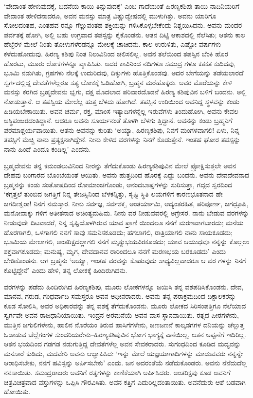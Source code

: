 ‘ವೇದಾಂತ ಹೇಳುವುದಕ್ಕೆ, ಬದನೆಯ ಕಾಯಿ ತಿನ್ನುವುದಕ್ಕೆ’ ಎಂಬ ಗಾದೆಯಂತೆ ಹಿರಣ್ಯಕಶಿಪು ತಾಯಿ ನಾದಿನಿಯರಿಗೆ ವೇದಾಂತ ಹೇಳಿದನಾದರೂ, ಅವನ ಮನಸ್ಸು ಮಾತ್ರ ವಿಷ್ಣುದ್ವೇಷದಲ್ಲಿ ಮುಳುಗಿತ್ತು. ಅವನು ಯಾರಿಗೂ ಸೋಲದಂತಹ, ಎಂತಹವ ರನ್ನೂ ಗೆಲ್ಲುವಂತಹ ಶಕ್ತಿಯನ್ನು ಗಳಿಸಿಕೊಳ್ಳಬೇಕೆಂದು ನಿಶ್ಚಯಿಸಿದನು. ಅವನು ಮಂದರ ಪರ್ವತಕ್ಕೆ ಹೋಗಿ, ಅಲ್ಲಿ ಬಹು ಉಗ್ರವಾದ ತಪಸ್ಸನ್ನು ಕೈಕೊಂಡನು. ಆತನ ದಿಟ್ಟಿ ಆಕಾಶದಲ್ಲಿ ನೆಲೆಸಿತು; ಆತನು ಕಾಲ ಹೆಬ್ಬೆರಳ ಮೇಲೆ ನಿಂತು ತೋಳುಗಳೆರಡನ್ನೂ ಮೇಲಕ್ಕೆ ಚಾಚಿದನು. ಕಾಲ ಉರುಳಿತು, ಎಷ್ಟೋ ವರ್ಷಗಳು ಕಳೆದುಹೋದುವು. ಹಿರಣ್ಯ ಕಶಿಪು ನಿಂತ ನಿಲುವಿನಿಂದ ಚಲಿಸಲಿಲ್ಲ. ಅವನ ತಲೆಯಿಂದ ತಪಸ್ಸಿನ ಬೆಂಕಿ ಹೊರ ಹೊರಟು, ಮೂರು ಲೋಕಗಳನ್ನೂ ವ್ಯಾಪಿಸಿತು. ಅದರ ಕಾವಿನಿಂದ ನದಿಗಳೂ ಸಮುದ್ರ ಗಳೂ ಕತಕತ ಕುದಿದವು, ಭೂಮಿ ನಡುಗಿತು, ಗ್ರಹಗಳು ನೆಲಕ್ಕೆ ಉದುರಿದವು, ದಿಕ್ಕುಗಳು ಹೊತ್ತಿಕೊಂಡವು. ಅದರ ಬೇಗೆಯನ್ನು ತಡೆಯಲಾರದೆ ಸ್ವರ್ಗದಲ್ಲಿದ್ದ ದೇವತೆಗಳೆಲ್ಲರೂ ಸತ್ಯ ಲೋಕಕ್ಕೆ ಓಡಿಹೋಗಿ, ಬ್ರಹ್ಮನ ಮರೆಹೊಕ್ಕರು. ಅವರ ಮೊರೆಯನ್ನು ಕೇಳಿ ಮನಸ್ಸು ಕರಗಿದ ಬ್ರಹ್ಮದೇವನು ಭೃಗು, ದಕ್ಷ ಮೊದಲಾದ ಪರಿವಾರದೊಡನೆ ಹಿರಣ್ಯ ಕಶಿಪುವಿನ ಬಳಿಗೆ ಬಂದನು. ಅಲ್ಲಿ ನೋಡುತ್ತಾನೆ. ಆ ತಪಸ್ವಿಯ ಮೇಲೆಲ್ಲ ಹುತ್ತ ಬೆಳದು ಹೋಗಿದೆ. ತಪಸ್ಸಿನ ಉರಿಯಿಂದ ಅವನಿದ್ದ ಸ್ಥಳವನ್ನು ಕಂಡು ಹಿಡಿಯಬೇಕಾಯಿತು. ಅವನ ಚರ್ಮ, ರಕ್ತ, ಮಾಂಸ ಇತ್ಯಾದಿಗಳನ್ನೆಲ್ಲ ಇರುವೆಗಳು ತಿಂದುಹೋಗಿ, ಅವನು ಕೇವಲ ಅಸ್ಥಿಪಂಜರದಂತಿದ್ದಾನೆ. ಆದರೂ ಅವನು ಸೂರ್ಯನಂತೆ ತೊಳಗಿ ಬೆಳಗು ತ್ತಿದ್ದಾನೆ. ಅವನನ್ನು ಕಂಡು ಬ್ರಹ್ಮನಿಗೆ ಪರಮಾಶ್ಚರ್ಯವಾಯಿತು. ಆತನು ಅವನನ್ನು ಕುರಿತು ‘ಅಯ್ಯಾ, ಹಿರಣ್ಯಕಶಿಪು, ನಿನಗೆ ಮಂಗಳವಾಗಲಿ! ಏಳು, ನಿನ್ನ ತಪಸ್ಸಿಗೆ ಮೆಚ್ಚಿ ನಾನು ಪ್ರತ್ಯಕ್ಷನಾಗಿದ್ದೇನೆ. ನೀನು ಕೇಳಿದ ವರಗಳನ್ನು ನಿನಗೆ ಕೊಡುತ್ತೇನೆ. ಇಂತಹ ಘೋರ ತಪಸ್ಸನ್ನು ನಾನು ಹಿಂದೆ ಎಂದೂ ಕಂಡಿಲ್ಲ’ ಎಂದನು.

ಬ್ರಹ್ಮದೇವನು ತನ್ನ ಕಮಂಡಲುವಿನಿಂದ ನೀರನ್ನು ತೆಗೆದುಕೊಂಡು ಹಿರಣ್ಯಕಶಿಪುವಿನ ಮೇಲೆ ಪ್ರೋಕ್ಷಿಸುತ್ತಲೇ ಅವನ ದೇಹವು ಬಂಗಾರದ ಬೊಂಬೆಯಂತೆ ಆಯಿತು. ಅವನು ಹುತ್ತದಿಂದ ಹೊರಕ್ಕೆ ಎದ್ದು ಬಂದನು. ಅವನು ದೇವದೇವನಾದ ಬ್ರಹ್ಮನನ್ನು ಕಂಡು ಸಂತೋಷದಿಂದ ರೋಮಾಂಚಗೊಂಡು, ಆನಂದಬಾಷ್ಪಗಳನ್ನು ಸುರಿಸುತ್ತಾ, ಗದ್ಗದ ಸ್ವರದಿಂದ ‘ಕಗ್ಗತ್ತಲೆ ತುಂಬಿದ ಜಗತ್ತಿಗೆ ನಿನ್ನ ತೇಜಸ್ಸಿನಿಂದ ಬೆಳಕನ್ನಿತ್ತು, ಸೃಷ್ಟಿ ಸ್ಥಿತಿ ಲಯಗಳಿಗೆ ಕಾರಣಭೂತನಾದ ಹೇ ಜಗದೀಶ್ವರಾ! ನಿನಗೆ ನಮಸ್ಕಾರ. ನೀನು ಸರ್ವಜ್ಞ, ಸರ್ವಶಕ್ತ, ಅಂತರ್ಯಾಮಿ, ಆದ್ಯಂತರಹಿತ, ಪರಿಪೂರ್ಣ, ಜಗದ್ರೂಪಿ, ಮನೋವಾಕ್ಕು ಗಳಿಗೆ ಅತೀತನಾದ ಅಚಿಂತ್ಯಮಹಿಮ. ನೀನು ವರ ನೀಡುವವರಲ್ಲಿ ಅಗ್ರೇಸರ. ನಾನು ಬೇಡುವ ವರಗಳನ್ನು ನೀಡುವುದೇ ದಿಟವಾದರೆ, ನಿನ್ನ ಸೃಷ್ಟಿಯೊಳಗಿರುವ ಯಾವ ಪ್ರಾಣಿ ಯಿಂದಲೂ ನನಗೆ ಮರಣವಾಗಬಾರದು; ಮನೆಯ ಹೊರಗಾಗಲಿ, ಒಳಗಾಗಲಿ ನನಗೆ ಸಾವು ಸಮನಿಸಕೂಡದು; ಹಗಲಾಗಲಿ, ರಾತ್ರಿಯಾಗಲಿ ನಾನು ಸಾಯಕೂಡದು; ಭೂಮಿಯ ಮೇಲಾಗಲಿ, ಅಂತರಿಕ್ಷದಲ್ಲಾಗಲಿ ನನಗೆ ಮೃತ್ಯುಭಯವಿರಕೂಡದು; ಯಾವ ಆಯುಧವೂ ನನ್ನನ್ನು ಕೊಲ್ಲಲು ಶಕ್ತವಾಗಕೂಡದು; ಮನುಷ್ಯ, ಮೃಗ, ದೇವದಾನವ ರಾರಿಂದಲೂ ನನಗೆ ಮರಣಭಯ ಬರಕೂಡದು’ ಎಂದು ಬೇಡಿಕೊಂಡನು. ಆಗ ಬ್ರಹ್ಮನು ‘ಅಯ್ಯಾ, ಇಂತಹ ವರವನ್ನು ಕೊಡುವುದು ಸಾಧ್ಯವಿಲ್ಲವಾದರೂ ಆ ವರ ಗಳನ್ನು ನಿನಗೆ ಕೊಟ್ಟಿದ್ದೇನೆ’ ಎಂದು ಹೇಳಿ, ತನ್ನ ಲೋಕಕ್ಕೆ ಹಿಂದಿರುಗಿದನು.

ವರಗಳನ್ನು ಪಡೆದು ಹಿಂದಿರುಗಿದ ಹಿರಣ್ಯಕಶಿಪು, ಮೂರು ಲೋಕಗಳನ್ನೂ ಜಯಿಸಿ ತನ್ನ ವಶಪಡಿಸಿಕೊಂಡನು. ದೇವ, ಮಾನವ, ಗರುಡ, ಗಂಧರ್ವಾದಿ ಸಮಸ್ತರೂ ಅವನ ಅಧೀನರಾದರು. ಅವನು ತನ್ನ ಪರಾಕ್ರಮದಿಂದ ದಿಕ್ಪಾಲಕರನ್ನು ಕೂಡ ಸೋಲಿಸಿ, ಅವರ ಅಧಿಕಾರವನ್ನು ತನ್ನ ವಶಕ್ಕೆ ತೆಗೆದುಕೊಂಡನು. ಮೂರು ಲೋಕದ ಸಿರಿಸಂಪತ್ತಿಗೂ ನೆಲೆಯಾದ ಸ್ವರ್ಗವೇ ಅವನ ರಾಜಧಾನಿಯಾಯಿತು. ಇಂದ್ರನ ಅರಮನೆಯೆ ಅವನ ವಾಸ ಸ್ಥಾನವಾಯಿತು. ರತ್ನದ ಪೀಠಗಳೇನು, ಮುತ್ತಿನ ಜಗುಲಿಗಳೇನು, ಹಾಲಿನ ನೊರೆಯಂ ತಿರುವ ಹಾಸಿಗೆಗಳೇನು, ಜಣಜಣನೆ ಕಾಲ್ಕಡಗಗಳ ದನಿಯನ್ನು ಚೆಲ್ಲುತ್ತ ಓಡಾಡುವ ಚೆಲ್ಲೆಗಂಗಳ ಸುಂದರಿಯರೇನು–ಹಿರಣ್ಯಕಶಿಪುವಿನ ಭೋಗ ಭಾಗ್ಯಕ್ಕೆ ಎಣೆಯಿಲ್ಲ, ಆತನ ಅಪ್ಪಣೆಗೆ ಇದಿರಿಲ್ಲ. ಆತನ ಭಯದಿಂದ ಗಡಗಡ ನಡುಗುತ್ತಿದ್ದ ದೇವತೆಗಳೆಲ್ಲ ಅವನ ಸೇವಕರಾದರು. ಸುಗಂಧದಿಂದ ಕೂಡಿದ ಮದ್ಯವನ್ನು ಮನಸಾರೆ ಕುಡಿದು, ಮದವೇರಿ ಅವನು ಆಜ್ಞಾಪಿಸಿದ: ‘ಇನ್ನು ಮೇಲೆ ಯಜ್ಞಯಾಗಾದಿಗಳನ್ನು ಮಾಡುವವರು ನನ್ನನ್ನೇ ಆರಾಧಿಸಬೇಕು, ನನಗೆ ಹವಿಸ್ಸನ್ನು ಅರ್ಪಿಸಬೇಕು’ ಎಂದು. ಜನ ಅದರಂತೆಯೆ ನಡೆದುಕೊಂಡರು. ಅವನು ನೆನೆದುದೆಲ್ಲ ನನಸಾಯಿತು. ಸಮುದ್ರರಾಜರು ಅವನಿಗೆ ರತ್ನಗಳನ್ನು ಕಾಣಿಕೆಯಾಗಿ ಅರ್ಪಿಸಿದರು. ಅಂತರಿಕ್ಷವು ಕೂಡ ಅವನಿಗೆ ಚಿತ್ರವಿಚಿತ್ರವಾದ ವಸ್ತುಗಳನ್ನು ಒಪ್ಪಿಸಿ ಗೌರವಿಸಿತು. ಅವನ ಕತ್ತಿಗೆ ಎದುರಿಲ್ಲದಂತಾಯಿತು. ಅವನೆದುರು ಆಶೆ ಬಡವಾಗಿ ಹೋಯಿತು.

